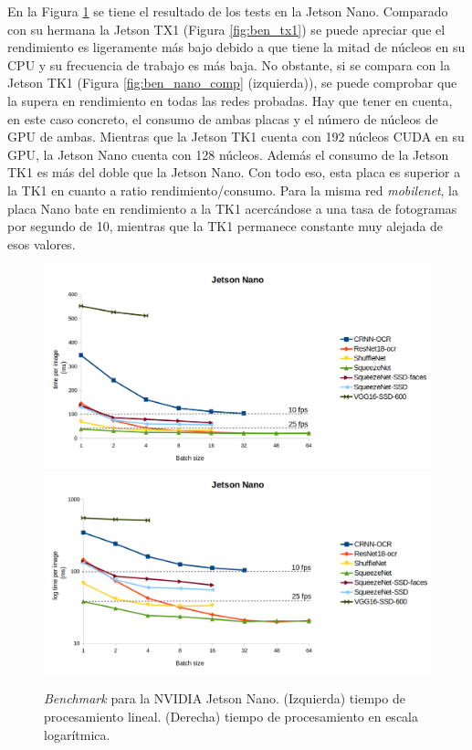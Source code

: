 En la Figura \ref{fig:ben_nano} se tiene el resultado de los tests en la Jetson Nano. Comparado con su hermana la Jetson TX1 (Figura \ref{fig:ben_tx1}) se puede apreciar que el rendimiento es ligeramente más bajo debido a que tiene la mitad de núcleos en su CPU y su frecuencia de trabajo es más baja. No obstante, si se compara con la Jetson TK1 (Figura \ref{fig:ben_nano_comp} (izquierda)), se puede comprobar que la supera en rendimiento en todas las redes probadas. Hay que tener en cuenta, en este caso concreto, el consumo de ambas placas y el número de núcleos de GPU de ambas. Mientras que la Jetson TK1 cuenta con 192 núcleos CUDA en su GPU, la Jetson Nano cuenta con 128 núcleos. Además el consumo de la Jetson TK1 es más del doble que la Jetson Nano. Con todo eso, esta placa es superior a la TK1 en cuanto a ratio rendimiento/consumo. Para la misma red \textit{mobilenet}, la placa Nano bate en rendimiento a la TK1 acercándose a una tasa de fotogramas por segundo de 10, mientras que la TK1 permanece constante muy alejada de esos valores.

\begin{figure}[htp]
    \centering
    \captionsetup{justification=centering}
    \includegraphics[width=.5\textwidth]{img/Jetson-nano-linear.png}\hfill
    \includegraphics[width=.5\textwidth]{img/Jetson-nano-log.png}
    \caption{\textit{Benchmark} para la NVIDIA Jetson Nano. (Izquierda) tiempo de procesamiento lineal. (Derecha) tiempo de procesamiento en escala logarítmica.}
    \label{fig:ben_nano}
\end{figure}

